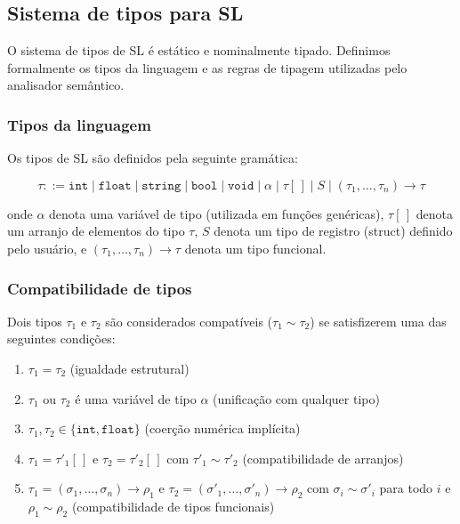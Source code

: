 \documentclass[12pt,a4paper]{article}
\begin{document}
\subsection{Sistema de tipos para SL}

O sistema de tipos de SL é estático e nominalmente tipado. Definimos formalmente os tipos da linguagem e as regras de tipagem utilizadas pelo analisador semântico.

\subsubsection{Tipos da linguagem}

Os tipos de SL são definidos pela seguinte gramática:

\[
\tau ::= \texttt{int} \mid \texttt{float} \mid \texttt{string} \mid \texttt{bool} \mid \texttt{void} \mid \alpha \mid \tau[\,] \mid S \mid (\tau_1, \ldots, \tau_n) \to \tau
\]

\noindent onde $\alpha$ denota uma variável de tipo (utilizada em funções genéricas), $\tau[\,]$ denota um arranjo de elementos do tipo $\tau$, $S$ denota um tipo de registro (struct) definido pelo usuário, e $(\tau_1, \ldots, \tau_n) \to \tau$ denota um tipo funcional.

\subsubsection{Compatibilidade de tipos}

Dois tipos $\tau_1$ e $\tau_2$ são considerados compatíveis ($\tau_1 \sim \tau_2$) se satisfizerem uma das seguintes condições:

\begin{enumerate}
    \item $\tau_1 = \tau_2$ (igualdade estrutural)
    \item $\tau_1$ ou $\tau_2$ é uma variável de tipo $\alpha$ (unificação com qualquer tipo)
    \item $\tau_1, \tau_2 \in \{\texttt{int}, \texttt{float}\}$ (coerção numérica implícita)
    \item $\tau_1 = \tau'_1[\,]$ e $\tau_2 = \tau'_2[\,]$ com $\tau'_1 \sim \tau'_2$ (compatibilidade de arranjos)
    \item $\tau_1 = (\sigma_1, \ldots, \sigma_n) \to \rho_1$ e $\tau_2 = (\sigma'_1, \ldots, \sigma'_n) \to \rho_2$ com $\sigma_i \sim \sigma'_i$ para todo $i$ e $\rho_1 \sim \rho_2$ (compatibilidade de tipos funcionais)
\end{enumerate}
\end{document}
